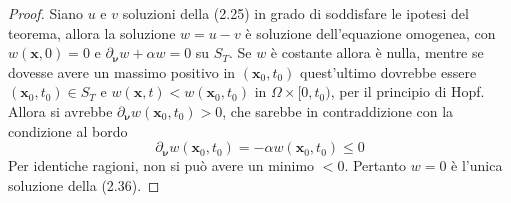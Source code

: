\documentclass[a4paper,12pt, draft]{article}
\theoremstyle{break}
\numberwithin{equation}{section}
\begin{document}
\begin{proof}
Siano $u$ e $v$ soluzioni della (2.25) in grado di soddisfare le ipotesi del teorema, allora la soluzione $w = u - v$ è soluzione dell'equazione omogenea, con $w(\bm{x}, 0) = 0 \mbox{ e } \partial_{\bm{\nu}}w + \alpha w = 0$ su $S_T$. Se $w$ è costante allora è nulla, mentre se dovesse avere un massimo positivo in $(\bm{x}_0, t_0)$ quest'ultimo dovrebbe essere $(\bm{x}_0, t_0) \in S_T$ e $w(\bm{x}, t) < w(\bm{x}_0, t_0)$ in $\Omega \times [0, t_0)$, per il principio di Hopf. Allora si avrebbe $\partial_{\bm{\nu}} w(\bm{x}_0, t_0) > 0$, che sarebbe in contraddizione con la condizione al bordo
$$
\partial_{\bm{\nu}}w(\bm{x}_0, t_0) = -\alpha w (\bm{x}_0, t_0) \leq 0
$$
Per identiche ragioni, non si può avere un minimo $< 0$. Pertanto $w = 0$ è l'unica soluzione della (2.36).
\end{proof}
\end{document}
